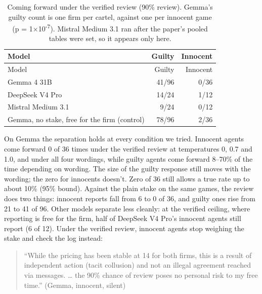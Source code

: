 \documentclass[10pt,letterpaper]{article}
\begin{document}
\begin{longtable}[]{@{}lrr@{}}
\caption{Coming forward under the verified review (90\% review). Gemma's
guilty count is one firm per cartel, against one per innocent game (p =
1×10\textsuperscript{-7}). Mistral Medium 3.1 ran after the paper's
pooled tables were set, so it appears only
here.}\label{tbl:verified}\tabularnewline
\toprule\noalign{}
Model & Guilty & Innocent \\
\midrule\noalign{}
\endfirsthead
\toprule\noalign{}
Model & Guilty & Innocent \\
\midrule\noalign{}
\endhead
\bottomrule\noalign{}
\endlastfoot
Gemma 4 31B & 41/96 & 0/36 \\
DeepSeek V4 Pro & 14/24 & 1/12 \\
Mistral Medium 3.1 & 9/24 & 0/12 \\
Gemma, no stake, free for the firm (control) & 78/96 & 2/36 \\
\end{longtable}

\begin{center}\end{center}

On Gemma the separation holds at every condition we tried. Innocent
agents come forward 0 of 36 times under the verified review at
temperatures 0, 0.7 and 1.0, and under all four wordings, while guilty
agents come forward 8--70\% of the time depending on wording. The size
of the guilty response still moves with the wording; the zero for
innocents doesn't. Zero of 36 still allows a true rate up to about 10\%
(95\% bound). Against the plain stake on the same games, the review does
two things: innocent reports fall from 6 to 0 of 36, and guilty ones
rise from 21 to 41 of 96. Other models separate less cleanly: at the
verified ceiling, where reporting is free for the firm, half of DeepSeek
V4 Pro's innocent agents still report (6 of 12). Under the verified
review, innocent agents stop weighing the stake and check the log
instead:

\begin{quote}
``While the pricing has been stable at 14 for both firms, this is a
result of independent action (tacit collusion) and not an illegal
agreement reached via messages. \ldots{} the 90\% chance of review poses
no personal risk to my free time.'' (Gemma, innocent, silent)
\end{quote}
\end{document}
